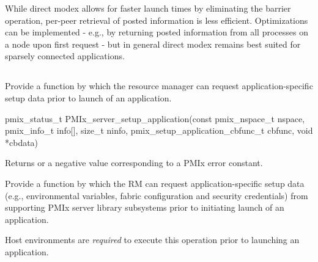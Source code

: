 \adviceuserstart
While direct modex allows for faster launch times by eliminating the barrier operation, per-peer retrieval of posted information is less efficient. Optimizations can be implemented - e.g., by returning posted information from all processes on a node upon first request - but in general direct modex remains best suited for sparsely connected applications.
\adviceuserend

\subsection{}

\summary

Provide a function by which the resource manager can request application-specific setup data prior to launch of an application.

\format

\cspecificstart
\begin{codepar}
pmix_status_t
PMIx_server_setup_application(const pmix_nspace_t nspace,
                        pmix_info_t info[], size_t ninfo,
                        pmix_setup_application_cbfunc_t cbfunc,
                        void *cbdata)
\end{codepar}
\cspecificend

\begin{arglist}
\end{arglist}

Returns  or a negative value corresponding to a PMIx error constant.

\descr

Provide a function by which the \ac{RM} can request application-specific setup data (e.g., environmental variables, fabric configuration and security credentials) from supporting \ac{PMIx} server library subsystems prior to initiating launch of an application.

\advicermstart
Host environments are \textit{required} to execute this operation prior to launching an application.
\advicermend

